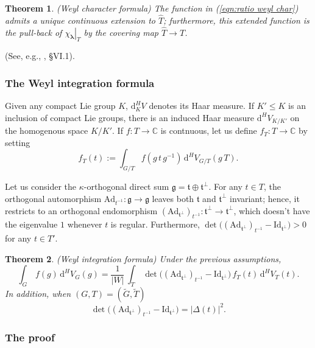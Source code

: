 \documentclass[12pt,a4paper]{article}
\theoremstyle{plain}
\newtheorem{thm}{Theorem}[section]
\theoremstyle{definition}
\begin{document}
\begin{thm}
(Weyl character formula)
The function in (\ref{eqn:ratio weyl char}) admits a unique continuous extension to $\hat{T}$; furthermore, this extended function is the pull-back of $\left.\chi_{\boldsymbol{\lambda}}\right|_T$ by the covering map
$\hat{T}\rightarrow T$.
\end{thm}
%
(See, e.g., \cite{btd}, \S VI.1).


\subsubsection{The Weyl integration formula}
\label{sctn:weyl integration for}

Given any compact Lie group $K$, $\mathrm{d}^H_KV$ denotes its
Haar measure. If $K'\leqslant K$ is an inclusion of compact Lie groups, there
is an induced Haar measure $\mathrm{d}^{H}V_{K/K'}$ on the
homogenous space $K/K'$.
If $f:T\rightarrow \mathbb{C}$ is contnuous, let us define
$f_T:T\rightarrow \mathbb{C}$ by setting
$$
f_T(t):=\int_{G/T}f\left(g\,t\,g^{-1}\right)\,
\mathrm{d}^HV_{G/T}(g\,T).
$$

Let us consider the $\kappa$-orthogonal direct sum
$\mathfrak{g}=\mathfrak{t}\oplus \mathfrak{t}^\perp$. For any $t\in T$,
the orthogonal automorphism $\mathrm{Ad}_{t^{-1}}:\mathfrak{g}\rightarrow
\mathfrak{g}$ leaves both $\mathfrak{t}$ and $\mathfrak{t}^\perp$
invariant; hence, it restricts to an orthogonal endomorphism
%
$(\mathrm{Ad}_{\mathfrak{t}^\perp})_{t^{-1}}:\mathfrak{t}^\perp\rightarrow \mathfrak{t}^\perp$, which doesn't have the eigenvalue $1$ whenever
$t$ is regular.
Furthermore,
$\det\big((\mathrm{Ad}_{\mathfrak{t}^\perp})_{t^{-1}}
-\mathrm{Id}_{\mathfrak{t}^\perp})>0$ for any $t\in T'$. 


\begin{thm}
(Weyl integration formula)
Under the previous assumptions,
$$
\int_G\,f(g)\,\mathrm{d}^HV_G(g)=\frac{1}{|W|}\,\int_T\,
\det\big((\mathrm{Ad}_{\mathfrak{t}^\perp})_{t^{-1}}
-\mathrm{Id}_{\mathfrak{t}^\perp})\,f_T(t)\,
\mathrm{d}^HV_T(t).
$$
In addition, when $(G,T)=(\tilde{G},\tilde{T})$
$$
\det\big((\mathrm{Ad}_{\mathfrak{t}^\perp})_{t^{-1}}
-\mathrm{Id}_{\mathfrak{t}^\perp})=
|\Delta(t)|^2.
$$
\end{thm}



\subsubsection{The proof}
\end{document}
